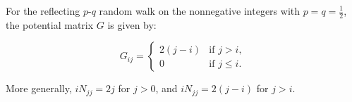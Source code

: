 For the reflecting $p$-$q$ random walk on the nonnegative integers with $p = q = \frac{1}{2}$, the potential matrix $G$ is given by:

$$G_{ij} = \begin{cases} 2(j-i) & \text{if } j > i, \\ 0 & \text{if } j \leq i. \end{cases}$$

More generally, $iN_{jj} = 2j$ for $j > 0$, and $iN_{jj} = 2(j-i)$ for $j > i$.
